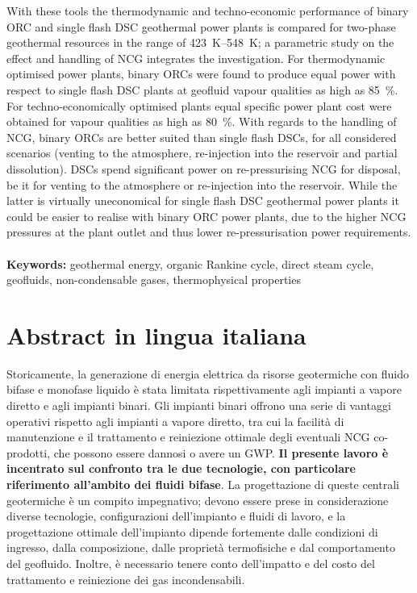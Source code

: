 With these tools the thermodynamic and techno-economic performance of binary \ac{ORC} and single flash \ac{DSC} geothermal power plants is compared for two-phase geothermal resources in the range of \qtyrange{423}{548}{\K}; a parametric study on the effect and handling of \ac{NCG} integrates the investigation.
For thermodynamic optimised power plants, binary \acp{ORC} were found to produce equal power with respect to single flash \ac{DSC} plants at geofluid vapour qualities as high as \qty{85}{\percent}. For techno-economically optimised  plants equal specific power plant cost were obtained for vapour qualities as high as \qty{80}{\percent}. With regards to the handling of \ac{NCG}, binary \acp{ORC} are better suited than single flash \acp{DSC}, for all considered scenarios (venting to the atmosphere, re-injection into the reservoir and partial dissolution). \acp{DSC} spend significant power on re-pressurising \ac{NCG} for disposal, be it for venting to the atmosphere or re-injection into the reservoir. While the latter is virtually uneconomical for single flash \ac{DSC} geothermal power plants it could be easier to realise with binary \ac{ORC} power plants, due to the higher \ac{NCG} pressures at the plant outlet and thus lower re-pressurisation power requirements. 
\\
\\
\textbf{Keywords:} geothermal energy, organic Rankine cycle, direct steam cycle, geofluids, non-condensable gases, thermophysical properties %

\chapter*{Abstract in lingua italiana}
Storicamente, la generazione di energia elettrica da risorse geotermiche con fluido bifase e monofase liquido è stata limitata rispettivamente agli impianti a vapore diretto e agli impianti binari. Gli impianti binari offrono una serie di vantaggi operativi rispetto agli impianti a vapore diretto, tra cui la facilità di manutenzione e il trattamento e reiniezione ottimale degli eventuali \acf{NCG} co-prodotti, che possono essere dannosi o avere un \acf{GWP}. \textbf{Il presente lavoro è incentrato sul confronto tra le due tecnologie, con particolare riferimento all’ambito dei fluidi bifase}. La progettazione di queste centrali geotermiche è un compito impegnativo; devono essere prese in considerazione diverse tecnologie, configurazioni dell’impianto e fluidi di lavoro, e la progettazione ottimale dell’impianto dipende fortemente dalle condizioni di ingresso, dalla composizione, dalle proprietà termofisiche e dal comportamento del geofluido. Inoltre, è necessario tenere conto dell’impatto e del costo del trattamento e reiniezione dei gas incondensabili. 

